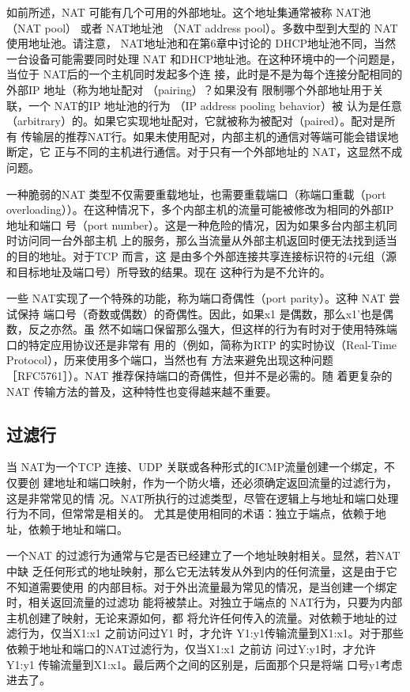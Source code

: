 如前所述，NAT 可能有几个可用的外部地址。这个地址集通常被称 NAT池（NAT
pool） 或者 NAT地址池 （NAT address pool）。多数中型到大型的 NAT 使用地址池。请注意，
NAT地址池和在第6章中讨论的 DHCP地址池不同，当然一台设备可能需要同时处理 NAT
和DHCP地址池。在这种环境中的一个问题是，当位于 NAT后的一个主机同时发起多个连
接，此时是不是为每个连接分配相同的外部IP 地址（称为地址配对 （pairing）？如果没有
限制哪个外部地址用于关联，一个 NAT的IP 地址池的行为 （IP address pooling behavior）被
认为是任意（arbitrary）的。如果它实现地址配对，它就被称为被配对（paired）。配对是所有
传输层的推荐NAT行。如果未使用配对，内部主机的通信对等端可能会错误地断定，它
正与不同的主机进行通信。对于只有一个外部地址的 NAT，这显然不成问题。

一种脆弱的NAT 类型不仅需要重载地址，也需要重载端口（称端口重載（port
overloading））。在这种情况下，多个内部主机的流量可能被修改为相同的外部IP地址和端口
号（port number）。这是一种危险的情况，因为如果多台内部主机同时访问同一台外部主机
上的服务，那么当流量从外部主机返回时便无法找到适当的目的地址。对于TCP 而言，这
是由多个外部连接共享连接标识符的4元组（源和目标地址及端口号）所导致的结果。现在
这种行为是不允许的。

一些 NAT实现了一个特殊的功能，称为端口奇偶性（port parity）。这种 NAT 尝试保持
端口号（奇数或偶数）的奇偶性。因此，如果x1 是偶数，那么x1'也是偶数，反之亦然。虽
然不如端口保留那么强大，但这样的行为有时对于使用特殊端口的特定应用协议还是非常有
用的（例如，简称为RTP 的实时协议（Real-Time Protocol），历来使用多个端口，当然也有
方法来避免出现这种问题［RFC5761］）。NAT 推荐保持端口的奇偶性，但并不是必需的。随
着更复杂的 NAT 传输方法的普及，这种特性也变得越来越不重要。

\subsection{过滤行}

当 NAT为一个TCP 连接、UDP 关联或各种形式的ICMP流量创建一个绑定，不仅要创
建地址和端口映射，作为一个防火墻，还必须确定返回流量的过滤行为，这是非常常见的情
况。NAT所执行的过滤类型，尽管在逻辑上与地址和端口处理行为不同，但常常是相关的。
尤其是使用相同的术语：独立于端点，依赖于地址，依赖于地址和端口。

一个NAT 的过滤行为通常与它是否已经建立了一个地址映射相关。显然，若NAT 中缺
乏任何形式的地址映射，那么它无法转发从外到内的任何流量，这是由于它不知道需要使用
的内部目标。对于外出流量最为常见的情况，是当创建一个绑定时，相关返回流量的过滤功
能将被禁止。对独立于端点的 NAT行为，只要为内部主机创建了映射，无论来源如何，都
将允许任何传入的流量。对依赖于地址的过滤行为，仅当X1:x1 之前访问过Y1 时，才允许
Y1:y1传输流量到X1:x1。对于那些依赖于地址和端口的NAT过滤行为，仅当X1:x1 之前访
问过Y:y1时，才允许 Y1:y1 传输流量到X1:x1。最后两个之间的区别是，后面那个只是将端
口号y1考虑进去了。

